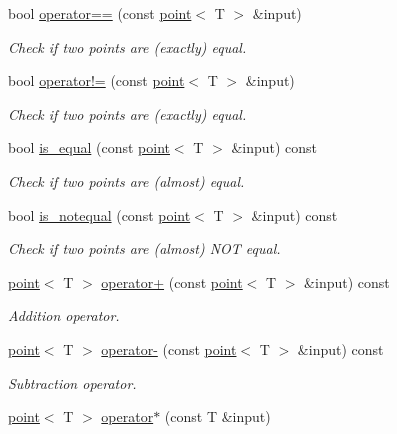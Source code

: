 \begin{DoxyCompactItemize}
bool \hyperlink{classddd_1_1point_a98f8e8097257f053b85e1ee32352fda4}{operator==} (const \hyperlink{classddd_1_1point}{point}$<$ T $>$ \&input)
\begin{DoxyCompactList}\small\item\em Check if two points are (exactly) equal. \end{DoxyCompactList}\item 
bool \hyperlink{classddd_1_1point_a2567b8c3cd08d965e70033f3f4a8d3db}{operator!=} (const \hyperlink{classddd_1_1point}{point}$<$ T $>$ \&input)
\begin{DoxyCompactList}\small\item\em Check if two points are (exactly) equal. \end{DoxyCompactList}\item 
bool \hyperlink{classddd_1_1point_aa4cdbbf16736ee09e840e33f77e94b8a}{is\+\_\+equal} (const \hyperlink{classddd_1_1point}{point}$<$ T $>$ \&input) const
\begin{DoxyCompactList}\small\item\em Check if two points are (almost) equal. \end{DoxyCompactList}\item 
bool \hyperlink{classddd_1_1point_a3d2415605fc07e3e0ed54ad68e2ade92}{is\+\_\+notequal} (const \hyperlink{classddd_1_1point}{point}$<$ T $>$ \&input) const
\begin{DoxyCompactList}\small\item\em Check if two points are (almost) N\+OT equal. \end{DoxyCompactList}\item 
\hyperlink{classddd_1_1point}{point}$<$ T $>$ \hyperlink{classddd_1_1point_ab0b0c990b117bb889d34d44509b645be}{operator+} (const \hyperlink{classddd_1_1point}{point}$<$ T $>$ \&input) const
\begin{DoxyCompactList}\small\item\em Addition operator. \end{DoxyCompactList}\item 
\hyperlink{classddd_1_1point}{point}$<$ T $>$ \hyperlink{classddd_1_1point_a5621f5a883c88d5588e09f9ff0de6575}{operator-\/} (const \hyperlink{classddd_1_1point}{point}$<$ T $>$ \&input) const
\begin{DoxyCompactList}\small\item\em Subtraction operator. \end{DoxyCompactList}\item 
\hyperlink{classddd_1_1point}{point}$<$ T $>$ \hyperlink{classddd_1_1point_a4291cf7411bd02324731a13143d718c6}{operator$\ast$} (const T \&input)

\end{DoxyCompactItemize}
